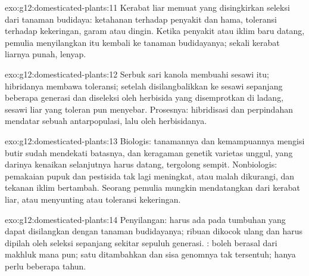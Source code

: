 \begin{solution}{exo:g12:domesticated-plants:11}
Kerabat liar memuat  yang disingkirkan seleksi dari tanaman
budidaya: ketahanan terhadap penyakit dan hama, toleransi terhadap
kekeringan, garam atau dingin. Ketika penyakit atau iklim baru datang,
pemulia menyilangkan  itu kembali ke tanaman budidayanya; sekali
kerabat liarnya punah,  lenyap.
\end{solution}

\begin{solution}{exo:g12:domesticated-plants:12}
Serbuk sari kanola membuahi sesawi itu; hibridanya membawa 
toleransi; setelah disilangbalikkan ke sesawi sepanjang beberapa
generasi dan diseleksi oleh herbisida yang disemprotkan di ladang,
sesawi liar yang toleran pun menyebar. Prosesnya: hibridisasi dan
perpindahan mendatar sebuah  antarpopulasi, lalu  oleh
herbisidanya.
\end{solution}

\begin{solution}{exo:g12:domesticated-plants:13}
Biologis:  tanamannya dan kemampuannya mengisi butir sudah
mendekati batasnya, dan keragaman genetik varietas unggul, yang
darinya kenaikan selanjutnya harus datang, tergolong sempit.
Nonbiologis: pemakaian pupuk dan pestisida tak lagi meningkat, atau
malah dikurangi, dan tekanan iklim bertambah. Seorang pemulia mungkin
mendatangkan  dari kerabat liar, atau menyunting  
atau  toleransi kekeringan.
\end{solution}

\begin{solution}{exo:g12:domesticated-plants:14}
Penyilangan:  harus ada pada tumbuhan yang dapat disilangkan
dengan tanaman budidayanya; ribuan  dikocok ulang dan harus dipilah
oleh seleksi sepanjang sekitar sepuluh generasi. : 
boleh berasal dari makhluk mana pun; satu  ditambahkan dan sisa
genomnya tak tersentuh; hanya perlu beberapa tahun.
\end{solution}

